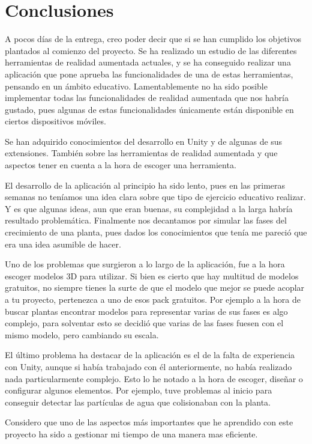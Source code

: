 

\section{Conclusiones}
A pocos días de la entrega, creo poder decir que si se han cumplido los objetivos plantados al comienzo del proyecto. Se ha realizado un estudio de las diferentes herramientas de realidad aumentada actuales, y se ha conseguido realizar una aplicación que pone aprueba las funcionalidades de una de estas herramientas, pensando en un ámbito educativo. Lamentablemente no ha sido posible implementar todas las funcionalidades de realidad aumentada que nos habría gustado, pues algunas de estas funcionalidades únicamente están disponible en ciertos dispositivos móviles.

Se han adquirido conocimientos del desarrollo en Unity y de algunas de sus extensiones. También sobre las herramientas de realidad aumentada y que aspectos tener en cuenta a la hora de escoger una herramienta.

El desarrollo de la aplicación al principio ha sido lento, pues en las primeras semanas no teníamos una idea clara sobre que tipo de ejercicio educativo realizar. Y es que algunas ideas, aun que eran buenas, su complejidad a la larga habría resultado problemática. Finalmente nos decantamos por simular las fases del crecimiento de una planta, pues dados los conocimientos que tenía me pareció que era una idea asumible de hacer.

Uno de los problemas que surgieron a lo largo de la aplicación, fue a la hora escoger modelos 3D para utilizar. Si bien es cierto que hay multitud de modelos gratuitos, no siempre tienes la surte de que el modelo que mejor se puede acoplar a tu proyecto, pertenezca a uno de esos pack gratuitos. Por ejemplo a la hora de buscar plantas encontrar modelos para representar varias de sus fases es algo complejo, para solventar esto se decidió que varias de las fases fuesen con el mismo modelo, pero cambiando su escala.

El último problema ha destacar de la aplicación es el de la falta de experiencia con Unity, aunque si había trabajado con él anteriormente, no había realizado nada particularmente complejo. Esto lo he notado a la hora de escoger, diseñar o configurar algunos elementos. Por ejemplo, tuve problemas al inicio para conseguir detectar las partículas de agua que colisionaban con la planta.

Considero que uno de las aspectos más importantes que he aprendido con este proyecto ha sido a gestionar mi tiempo de una manera mas eficiente.

